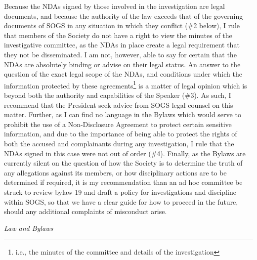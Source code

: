 \begin{multicols}{2}
\begin{longenum}[ label*=\arabic*., align=left]
\begin{longenum}
Because the NDAs signed by those involved in the investigation are legal documents, and because the authority of the law exceeds that of the governing documents of SOGS in any situation in which they conflict (\#2 below), I rule that members of the Society do not have a right to view the minutes of the investigative committee, as the NDAs in place create a legal requirement that they not be disseminated.
I am not, however, able to say for certain that the NDAs are absolutely binding or advise on their legal status. An answer to the question of the exact legal scope of the NDAs, and conditions under which the information protected by these agreements\footnote{i.e., the minutes of the committee and details of the investigation}  is a matter of legal opinion which is beyond both the authority and capabilities of the Speaker (\#3). As such, I recommend that the President seek advice from SOGS legal counsel on this matter.
Further, as I can find no language in the Bylaws which would serve to prohibit the use of a Non-Disclosure Agreement to protect certain sensitive information, and due to the importance of being able to protect the rights of both the accused and complainants during any investigation, I rule that the NDAs signed in this case were not out of order (\#4).
Finally, as the Bylaws are currently silent on the question of how the Society is to determine the truth of any allegations against its members, or how disciplinary actions are to be determined if required, it is my recommendation than an ad hoc committee be struck to review bylaw 19 and draft a policy for investigations and discipline within SOGS, so that we have a clear guide for how to proceed in the future, should any additional complaints of misconduct arise.

\item \textit{Law and Bylaws}


\end{longenum}
\end{longenum}
\end{multicols}
